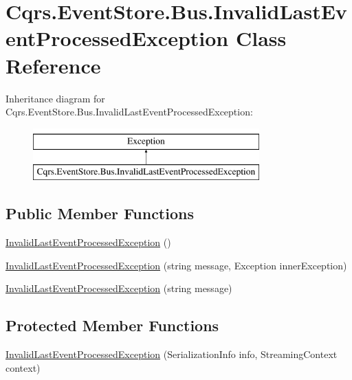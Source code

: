\hypertarget{classCqrs_1_1EventStore_1_1Bus_1_1InvalidLastEventProcessedException}{}\section{Cqrs.\+Event\+Store.\+Bus.\+Invalid\+Last\+Event\+Processed\+Exception Class Reference}
\label{classCqrs_1_1EventStore_1_1Bus_1_1InvalidLastEventProcessedException}
Inheritance diagram for Cqrs.\+Event\+Store.\+Bus.\+Invalid\+Last\+Event\+Processed\+Exception\+:\begin{figure}[H]
\begin{center}
\leavevmode
\includegraphics[height=2.000000cm]{classCqrs_1_1EventStore_1_1Bus_1_1InvalidLastEventProcessedException}
\end{center}
\end{figure}
\subsection*{Public Member Functions}
\begin{DoxyCompactItemize}
\item 
\hyperlink{classCqrs_1_1EventStore_1_1Bus_1_1InvalidLastEventProcessedException_aa941d9b0c42053195d592ed07bcfcb08}{Invalid\+Last\+Event\+Processed\+Exception} ()
\item 
\hyperlink{classCqrs_1_1EventStore_1_1Bus_1_1InvalidLastEventProcessedException_ac0de4bdfa1896dfae88644a2ae422145}{Invalid\+Last\+Event\+Processed\+Exception} (string message, Exception inner\+Exception)
\item 
\hyperlink{classCqrs_1_1EventStore_1_1Bus_1_1InvalidLastEventProcessedException_a01e8e2b27b64b5404f20bcfa2627b06c}{Invalid\+Last\+Event\+Processed\+Exception} (string message)
\end{DoxyCompactItemize}
\subsection*{Protected Member Functions}
\begin{DoxyCompactItemize}
\item 
\hyperlink{classCqrs_1_1EventStore_1_1Bus_1_1InvalidLastEventProcessedException_aa14bdf5c6f8c0227dd3919b1fed91417}{Invalid\+Last\+Event\+Processed\+Exception} (Serialization\+Info info, Streaming\+Context context)
\end{DoxyCompactItemize}


